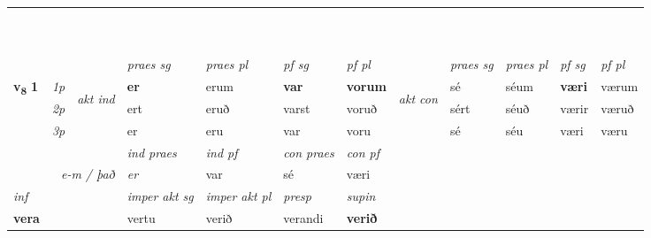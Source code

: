\begin{longtable}[l]{X>{\footnotesize\itshape}llXXXXlXXXX}
\midrule
& \\*
   & \\*
   & \\*
  & \\*
   & \\*
   & \\*
   & \\*
  & \\*
   & \\*
  & \\
   \midrule
 & &   & \textit{praes sg}  & \textit{praes pl}    & \textit{ pf sg} & \textit{pf pl} & & \textit{praes sg}  & \textit{praes pl}    & \textit{pf sg} & \textit{pf pl }  \\ \cmidrule{4-7} \cmidrule{9-12}
 \multirow{2}{*}{{{\textbf{v{\textsubscript{8}}} \Large{\textbf{1}}}}}  & 1p & \multirow{3}{*}{\begin{turn}{90}\textit{akt ind}\end{turn}} & \textbf{er} & erum & \textbf{var} & \textbf{vorum} & \multirow{3}{*}{\begin{turn}{90}\textit{akt con}\end{turn}} &sé & séum & \textbf{væri} & værum\\*
 & 2p &  &  ert  & eruð & varst & voruð & & sért & séuð & værir & væruð \\*
 & 3p &  & er & eru & var & voru & & sé & séu& væri & væru \\*
\cmidrule{4-7} \cmidrule{9-12}

   && &  \textit{ind praes} & \textit{ind pf} & \textit{con praes} & \textit{con pf} \\*
\multicolumn{3}{r}{\textit{e-m / það}} & er & var & sé & væri \\*

\cmidrule{4-7}
   {\textit{inf}} & &  & \textit{imper akt sg} & \textit{imper akt pl}   & \textit{presp} & \textit{supin}   \\*
  {\textbf{vera}} & && vertu  & verið   & verandi &  \textbf{verið}   \\*

\midrule


\end{longtable}
